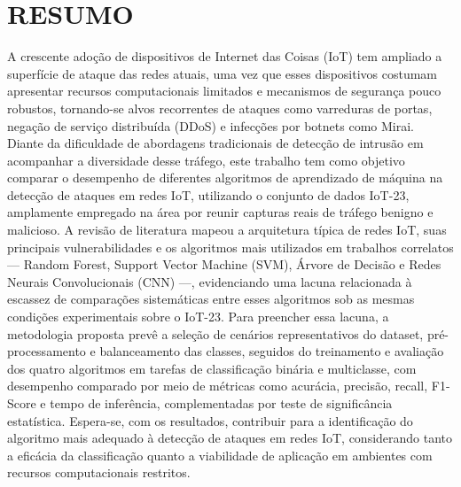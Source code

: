 \chapter{RESUMO}\label{chap:resumo}

A crescente adoção de dispositivos de Internet das Coisas (IoT) tem ampliado a superfície de ataque das redes atuais, uma vez que esses dispositivos costumam apresentar recursos computacionais limitados e mecanismos de segurança pouco robustos, tornando-se alvos recorrentes de ataques como varreduras de portas, negação de serviço distribuída (DDoS) e infecções por botnets como Mirai. Diante da dificuldade de abordagens tradicionais de detecção de intrusão em acompanhar a diversidade desse tráfego, este trabalho tem como objetivo comparar o desempenho de diferentes algoritmos de aprendizado de máquina na detecção de ataques em redes IoT, utilizando o conjunto de dados IoT-23, amplamente empregado na área por reunir capturas reais de tráfego benigno e malicioso. A revisão de literatura mapeou a arquitetura típica de redes IoT, suas principais vulnerabilidades e os algoritmos mais utilizados em trabalhos correlatos — Random Forest, Support Vector Machine (SVM), Árvore de Decisão e Redes Neurais Convolucionais (CNN) —, evidenciando uma lacuna relacionada à escassez de comparações sistemáticas entre esses algoritmos sob as mesmas condições experimentais sobre o IoT-23. Para preencher essa lacuna, a metodologia proposta prevê a seleção de cenários representativos do dataset, pré-processamento e balanceamento das classes, seguidos do treinamento e avaliação dos quatro algoritmos em tarefas de classificação binária e multiclasse, com desempenho comparado por meio de métricas como acurácia, precisão, recall, F1-Score e tempo de inferência, complementadas por teste de significância estatística. Espera-se, com os resultados, contribuir para a identificação do algoritmo mais adequado à detecção de ataques em redes IoT, considerando tanto a eficácia da classificação quanto a viabilidade de aplicação em ambientes com recursos computacionais restritos.